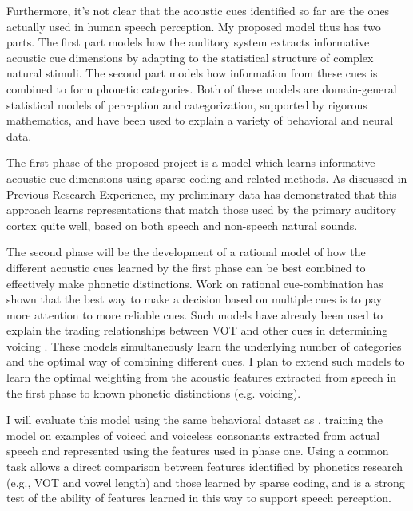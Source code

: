\documentclass[12pt]{article}
\begin{document}
Furthermore, it's not clear that the acoustic cues identified so far are the ones actually used in human speech perception.  My proposed model thus has two parts.  The first part models how the auditory system extracts informative acoustic cue dimensions by adapting to the statistical structure of complex natural stimuli.  The second part models how information from these cues is combined to form phonetic categories.  Both of these models are domain-general statistical models of perception and categorization, supported by rigorous mathematics, and have been used to explain a variety of behavioral and neural data.

The first phase of the proposed project is a model which learns informative acoustic cue dimensions using sparse coding and related methods.  As discussed in Previous Research Experience, my preliminary data\cite{Kleinschmidt2010} has demonstrated that this approach learns representations that match those used by the primary auditory cortex quite well, based on both speech and non-speech natural sounds.

The second phase will be the development of a rational model of how the different acoustic cues learned by the first phase can be best combined to effectively make phonetic distinctions.  Work on rational cue-combination has shown that the best way to make a decision based on multiple cues is to pay more attention to more reliable cues.  Such models have already been used to explain the trading relationships between VOT and other cues in determining voicing \cite{Toscano2008}.  These models simultaneously learn the underlying number of categories and the optimal way of combining different cues.  I plan to extend such models to learn the optimal weighting from the acoustic features extracted from speech in the first phase to known phonetic distinctions (e.g. voicing).

I will evaluate this model using the same behavioral dataset as \cite{Toscano2008}, training the model on examples of voiced and voiceless consonants extracted from actual speech and represented using the features used in phase one.  Using a common task allows a direct comparison between features identified by phonetics research (e.g., VOT and vowel length) and those learned by sparse coding, and is a strong test of the ability of features learned in this way to support speech perception.
\end{document}
